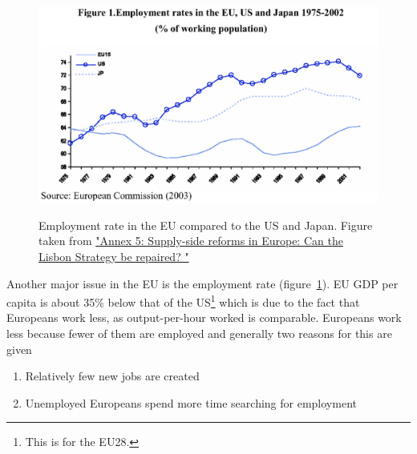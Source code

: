 \documentclass{tufte-handout}
\begin{document}
\begin{figure}
  \includegraphics[scale=.3]{employment_rate}
  \label{fig:employment}
  \caption{Employment rate in the EU compared to the US and Japan. Figure taken from \href{http://www.eui.eu/Documents/RSCAS/Research/EFN/Reports/Annex2004Autumn/Annex5autumn2004.pdf}{"Annex 5: Supply-side reforms in Europe: Can the Lisbon Strategy be repaired? "}}
\end{figure}


Another major issue in the EU is the employment rate (figure~\ref{fig:employment}).
EU GDP per capita is about 35\% below that of the US\footnote{This is for the EU28.} which is due to the fact that Europeans work less, as output-per-hour worked is comparable. 
Europeans work less because fewer of them are employed and generally two reasons for this are given
\begin{enumerate}
  \item Relatively few new jobs are created
  \item Unemployed Europeans spend more time searching for employment
\end{enumerate}

\end{document}
